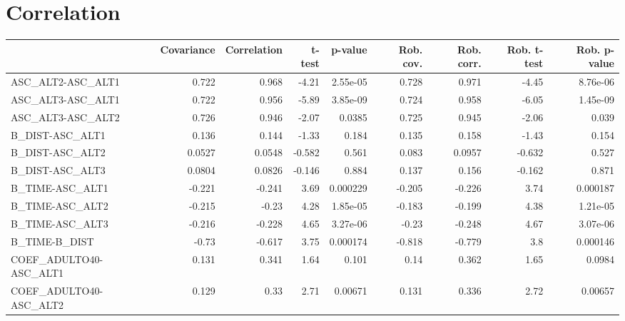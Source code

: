 \section{Correlation}
\begin{tabular}{lrrrrrrrr}
\toprule
{} &  Covariance &  Correlation &   t-test &  p-value &  Rob. cov. &  Rob. corr. &  Rob. t-test &  Rob. p-value \\
\midrule
ASC\_ALT2-ASC\_ALT1                 &       0.722 &        0.968 &    -4.21 & 2.55e-05 &      0.728 &       0.971 &        -4.45 &      8.76e-06 \\
ASC\_ALT3-ASC\_ALT1                 &       0.722 &        0.956 &    -5.89 & 3.85e-09 &      0.724 &       0.958 &        -6.05 &      1.45e-09 \\
ASC\_ALT3-ASC\_ALT2                 &       0.726 &        0.946 &    -2.07 &   0.0385 &      0.725 &       0.945 &        -2.06 &         0.039 \\
B\_DIST-ASC\_ALT1                   &       0.136 &        0.144 &    -1.33 &    0.184 &      0.135 &       0.158 &        -1.43 &         0.154 \\
B\_DIST-ASC\_ALT2                   &      0.0527 &       0.0548 &   -0.582 &    0.561 &      0.083 &      0.0957 &       -0.632 &         0.527 \\
B\_DIST-ASC\_ALT3                   &      0.0804 &       0.0826 &   -0.146 &    0.884 &      0.137 &       0.156 &       -0.162 &         0.871 \\
B\_TIME-ASC\_ALT1                   &      -0.221 &       -0.241 &     3.69 & 0.000229 &     -0.205 &      -0.226 &         3.74 &      0.000187 \\
B\_TIME-ASC\_ALT2                   &      -0.215 &        -0.23 &     4.28 & 1.85e-05 &     -0.183 &      -0.199 &         4.38 &      1.21e-05 \\
B\_TIME-ASC\_ALT3                   &      -0.216 &       -0.228 &     4.65 & 3.27e-06 &      -0.23 &      -0.248 &         4.67 &      3.07e-06 \\
B\_TIME-B\_DIST                     &       -0.73 &       -0.617 &     3.75 & 0.000174 &     -0.818 &      -0.779 &          3.8 &      0.000146 \\
COEF\_ADULTO40-ASC\_ALT1            &       0.131 &        0.341 &     1.64 &    0.101 &       0.14 &       0.362 &         1.65 &        0.0984 \\
COEF\_ADULTO40-ASC\_ALT2            &       0.129 &         0.33 &     2.71 &  0.00671 &      0.131 &       0.336 &         2.72 &       0.00657 \\

\end{tabular}
